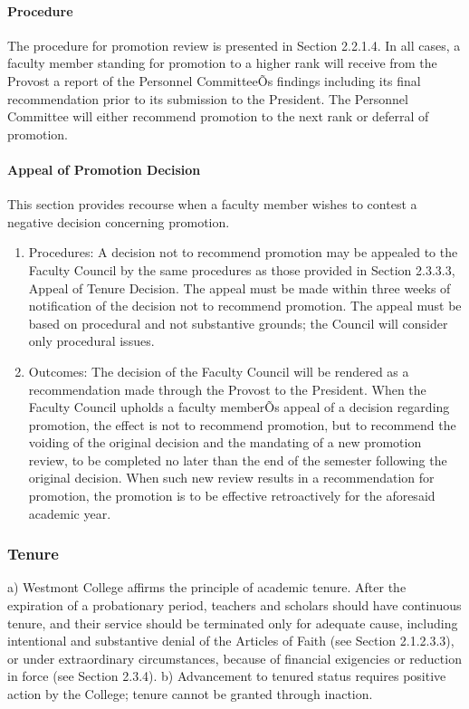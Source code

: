 \documentclass[letterpaper, 11pt]{article}
\begin{document}
			\paragraph{Procedure}
				The procedure for promotion review is presented in Section 2.2.1.4.  In all cases, a faculty member standing for promotion to a higher rank will receive from the Provost a report of the Personnel CommitteeÕs findings including its final recommendation prior to its submission to the President.  The Personnel Committee will either recommend promotion to the next rank or deferral of promotion.
			\paragraph{Appeal of Promotion Decision}
				This section provides recourse when a faculty member wishes to contest a negative decision concerning promotion.
				\begin{enumerate}[label=\alph*)]
					\item{Procedures:}
					A decision not to recommend promotion may be appealed to the Faculty Council by the same procedures as those provided in Section 2.3.3.3, Appeal of Tenure Decision. The appeal must be made within three weeks of notification of the decision not to recommend promotion. The appeal must be based on procedural and not substantive grounds; the Council will consider only procedural issues.
					\item{Outcomes:}
					The decision of the Faculty Council will be rendered as a recommendation made through the Provost to the President. When the Faculty Council upholds a faculty memberÕs appeal of a decision regarding promotion, the effect is not to recommend promotion, but to recommend the voiding of the original decision and the mandating of a new promotion review, to be completed no later than the end of the semester following the original decision.  When such new review results in a recommendation for promotion, the promotion is to be effective retroactively for the aforesaid academic year.
				\end{enumerate}
		\subsubsection{Tenure}
			a) Westmont College affirms the principle of academic tenure.  After the expiration of a probationary period, teachers and scholars should have continuous tenure, and their service should be terminated only for adequate cause, including intentional and substantive denial of the Articles of Faith (see Section 2.1.2.3.3), or under extraordinary circumstances, because of financial exigencies or reduction in force (see Section 2.3.4).
			b) Advancement to tenured status requires positive action by the College; tenure cannot be granted through inaction.
\end{document}
